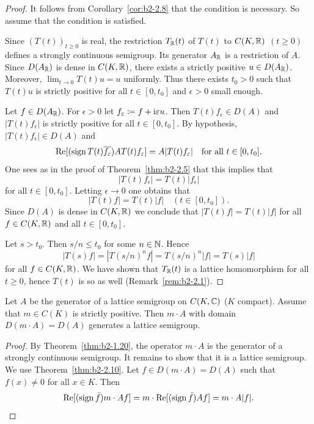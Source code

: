 \begin{proof}%
It follows from  Corollary~\ref{cor:b2-2.8} that the condition is necessary.
So assume that the condition is satisfied.

Since $(T(t))_{t \geq 0}$ is real, the restriction $T_{\mathbb{R}}(t)$ of\/ $T(t)$ to $C(K,\mathbb{R})$ $(t \geq 0)$ defines a strongly continuous semigroup.
Its generator $A_{\mathbb{R}}$ is a restriction of\/ $A$.
Since $D(A_{\mathbb{R}})$ is dense in $C(K,\mathbb{R})$, there exists a strictly positive $u \in D(A_{\mathbb{R}})$.
Moreover, $\lim_{t \to 0} T(t)u = u$ uniformly.
Thus there exists $t_{0} > 0$ such that $T(t)u$ is strictly positive for all $t \in [0,t_{0}]$ and $ \epsilon > 0 $ small enough.
 
Let $f \in D(A_{\mathbb{R}})$.
For $\epsilon > 0$ let $f_{\epsilon} \coloneq f + \iu \epsilon u$.
Then $T(t)f_{\epsilon} \in D(A)$ and $|T(t)f_{\epsilon}|$ is strictly positive for all $t \in [0,t_{0}]$.
By hypothesis, $|T(t)f_{\epsilon}| \in D(A)$ and 
\[
\Re[(\sign T(t)\overline{f_{\epsilon}})AT(t)f_{\epsilon}] = A|T(t)f_{\epsilon}|
\quad \text{for all $t \in [0,t_{0}]$}.
\]
One sees as in the proof of Theorem~\ref{thm:b2-2.5} that this implies that 
%
\[
	|T(t)f_{\epsilon}| = T(t)|f_{\epsilon}| 
\]
%
for all $t \in [0,t_{0}]$.
Letting $\epsilon \to 0$ one obtains that 
%
\[
	 |T(t)f| = T(t)|f| \quad (t \in [0,t_{0}]) .
\]
%
Since $D(A)$ is dense in $C(K,\mathbb{R})$ we conclude that $|T(t)f| = T(t)|f|$ for all $f \in C(K,\mathbb{R})$ and all $t \in [0,t_{0}]$.

Let $s > t_{0}$.
Then $s/n \leq t_{0}$ for some $n \in \mathbb{N}$.
Hence 
%
\[
	|T(s)f| = |T(s/n)^{n}f| = T(s/n)^{n}|f| = T(s)|f|
\]
%
for all $f \in C(K,\mathbb{R})$.
We have shown that $T_{\mathbb{R}}(t)$ is a lattice homomorphism for all $t \geq 0$,  hence $T(t)$ is so as well (\cf Remark~\ref{rem:b2-2.1}).
\end{proof}
\begin{corollary}\label{cor:b2-2.11}
Let $A$ be the generator of a lattice semigroup on $C(K,\mathbb{C})$ ($K$ compact).
Assume that  $m \in C(K)$ is strictly positive.
Then  $m \cdot A$ with domain $D(m \cdot A) = D(A)$ generates a lattice semigroup.
\end{corollary}
\begin{proof}
By Theorem~\ref{thm:b2-1.20}, the operator  $m \cdot A$ is the generator of a strongly continuous semigroup.
It remains to show that it is a lattice semigroup.
We use Theorem~\ref{thm:b2-2.10}.
Let $f \in D(m \cdot A) = D(A)$ such that $f(x) \neq 0$ for all $x \in K$.
Then 
\begin{equation*}
\mathop{}\!\mathrm{Re}[(\operatorname{sign} \bar{f})m \cdot Af] = m \cdot \mathop{}\!\mathrm{Re}[(\operatorname{sign} \bar{f})Af] = m \cdot A|f|.
\qedhere
\end{equation*}
\end{proof}
